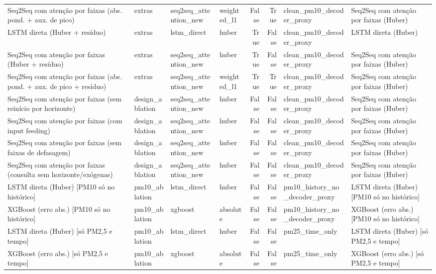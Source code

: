 \begin{table}[!htbp]
\begin{adjustbox}{max width=\textwidth}
\begin{tabular}{>{\raggedright\arraybackslash}p{}lllrrl>{\raggedright\arraybackslash}p{}}
        Seq2Seq com atenção por faixas (abs. pond. + aux. de pico) & extras & seq2seq\_attention\_new & weighted\_l1 & False & True & clean\_pm10\_decoder\_proxy & Seq2Seq com atenção por faixas (Huber) \\
        LSTM direta (Huber + resíduo) & extras & lstm\_direct & huber & True & False & clean\_pm10\_decoder\_proxy & LSTM direta (Huber) \\
        Seq2Seq com atenção por faixas (Huber + resíduo) & extras & seq2seq\_attention\_new & huber & True & False & clean\_pm10\_decoder\_proxy & Seq2Seq com atenção por faixas (Huber) \\
        Seq2Seq com atenção por faixas (abs. pond. + aux. de pico + resíduo) & extras & seq2seq\_attention\_new & weighted\_l1 & True & True & clean\_pm10\_decoder\_proxy & Seq2Seq com atenção por faixas (Huber) \\
        Seq2Seq com atenção por faixas (sem reinício por horizonte) & design\_ablation & seq2seq\_attention\_new & huber & False & False & clean\_pm10\_decoder\_proxy & Seq2Seq com atenção por faixas (Huber) \\
        Seq2Seq com atenção por faixas (com input feeding) & design\_ablation & seq2seq\_attention\_new & huber & False & False & clean\_pm10\_decoder\_proxy & Seq2Seq com atenção por faixas (Huber) \\
        Seq2Seq com atenção por faixas (sem faixas de defasagem) & design\_ablation & seq2seq\_attention\_new & huber & False & False & clean\_pm10\_decoder\_proxy & Seq2Seq com atenção por faixas (Huber) \\
        Seq2Seq com atenção por faixas (consulta sem horizonte/exógenas) & design\_ablation & seq2seq\_attention\_new & huber & False & False & clean\_pm10\_decoder\_proxy & Seq2Seq com atenção por faixas (Huber) \\
        LSTM direta (Huber) [PM10 só no histórico] & pm10\_ablation & lstm\_direct & huber & False & False & pm10\_history\_no\_decoder\_proxy & LSTM direta (Huber) [PM10 só no histórico] \\
        XGBoost (erro abs.) [PM10 só no histórico] & pm10\_ablation & xgboost & absolute & False & False & pm10\_history\_no\_decoder\_proxy & XGBoost (erro abs.) [PM10 só no histórico] \\
        LSTM direta (Huber) [só PM2,5 e tempo] & pm10\_ablation & lstm\_direct & huber & False & False & pm25\_time\_only & LSTM direta (Huber) [só PM2,5 e tempo] \\
        XGBoost (erro abs.) [só PM2,5 e tempo] & pm10\_ablation & xgboost & absolute & False & False & pm25\_time\_only & XGBoost (erro abs.) [só PM2,5 e tempo] \\

\end{tabular}
\end{adjustbox}
\end{table}
